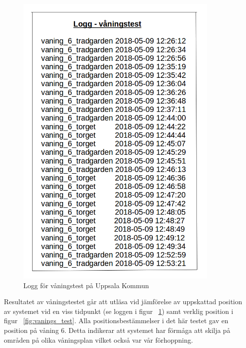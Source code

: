 \documentclass[a4paper,12pt]{article}
\begin{document}
 \begin{figure}[H]
   \centering
   \includegraphics[width=10cm]{media/logg_vaningstest.png}
   \caption{Logg för våningstest på Uppsala Kommun}
   \label{fig:logg_vaningstest}
 \end{figure}

 Resultatet av våningstestet går att utläsa vid jämförelse av uppskattad position av systemet vid en viss tidpunkt (se loggen i figur ~\ref{fig:logg_vaningstest}) samt verklig position i figur ~\ref{fig:vanings_test}. Alla positionsbestämmelser i det här testet gav en position på våning 6. Detta indikerar att systemet har förmåga att skilja på områden på olika våningsplan vilket också var vår förhoppning.
\end{document}
